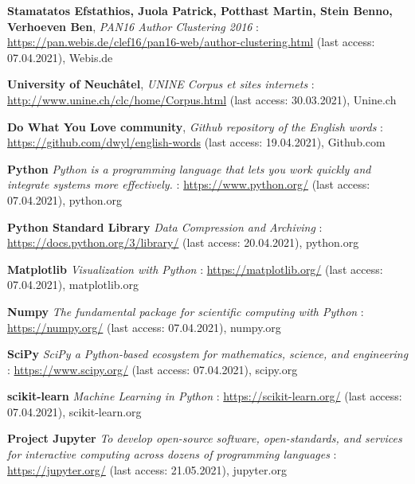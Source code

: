 \begin{thebibliography}{9}
\textbf{Stamatatos Efstathios, Juola Patrick, Potthast Martin, Stein Benno, Verhoeven Ben},
\textit{PAN16 Author Clustering 2016} : \url{https://pan.webis.de/clef16/pan16-web/author-clustering.html} (last access: 07.04.2021),
Webis.de

\textbf{University of Neuchâtel},
\textit{UNINE Corpus et sites internets} : \url{http://www.unine.ch/clc/home/Corpus.html} (last access: 30.03.2021),
Unine.ch

\textbf{Do What You Love community},
\textit{Github repository of the English words} : \url{https://github.com/dwyl/english-words} (last access: 19.04.2021),
Github.com



\textbf{Python}
\textit{Python is a programming language that lets you work quickly and integrate systems more effectively.} : \url{https://www.python.org/} (last access: 07.04.2021),
python.org

\textbf{Python Standard Library}
\textit{Data Compression and Archiving} : \url{https://docs.python.org/3/library/} (last access: 20.04.2021),
python.org

\textbf{Matplotlib}
\textit{Visualization with Python} : \url{https://matplotlib.org/} (last access: 07.04.2021),
matplotlib.org

\textbf{Numpy}
\textit{The fundamental package for scientific computing with Python} : \url{https://numpy.org/} (last access: 07.04.2021),
numpy.org

\textbf{SciPy}
\textit{SciPy a Python-based ecosystem for mathematics, science, and engineering} : \url{https://www.scipy.org/} (last access: 07.04.2021),
scipy.org

\textbf{scikit-learn}
\textit{Machine Learning in Python} : \url{https://scikit-learn.org/} (last access: 07.04.2021),
scikit-learn.org

\textbf{Project Jupyter}
\textit{To develop open-source software, open-standards, and services for interactive computing across dozens of programming languages} : \url{https://jupyter.org/} (last access: 21.05.2021),
jupyter.org


\end{thebibliography}
